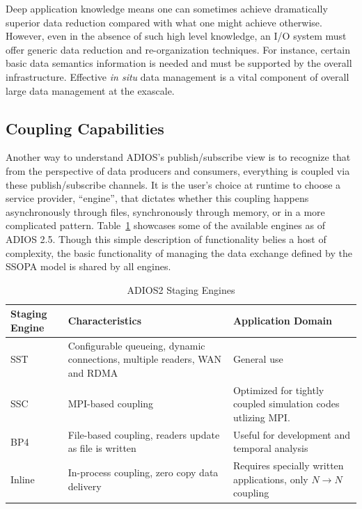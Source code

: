 Deep application knowledge means one can sometimes achieve dramatically superior data reduction compared with what one might achieve otherwise. However, even in the absence of such high level knowledge, an I/O system must offer generic data reduction and re-organization techniques. For instance, certain basic data semantics information is needed and must be supported by the overall infrastructure. Effective \textit{in situ} data management is a vital component of overall large data management at the exascale.


\subsection{Coupling Capabilities %
}
\label{sec:coupling}

Another way to understand ADIOS's publish/subscribe view\cite{Flexpath,choi2018} is to recognize that from the perspective of data producers and consumers, everything is coupled via these publish/subscribe channels. It is the user's choice at runtime to choose a service provider, ``engine'', that dictates whether this coupling happens asynchronously through files, synchronously through memory, or in a more complicated pattern. Table~\ref{tab:engines} showcases some of the available engines as of ADIOS 2.5.
Though this simple description of functionality belies a host of complexity,
the basic functionality of managing the data exchange defined by the SSOPA model is shared by all engines.


\begin{table}
\begin{center}
\footnotesize 
{}
\begin{tabular}{ | m{7em} || m{15em}| m{15em} | } 
\hline
\rowcolor{gray!55}
Staging Engine & Characteristics & Application Domain \\ 
\hline \hline
SST & Configurable queueing, dynamic connections, multiple readers, WAN and RDMA &  General use\\ 
\hline
SSC & MPI-based coupling & Optimized for tightly coupled simulation codes utlizing MPI. \\ 
\hline
BP4 & File-based coupling, readers update as file is written  & Useful for development and temporal analysis\\ 
\hline
Inline & In-process coupling, zero copy data delivery & Requires specially written applications, only $N\rightarrow N$ coupling\\
\hline
\end{tabular}
\caption{ADIOS2 Staging Engines} \label{tab:engines}
\vspace{-25pt}
\end{center}
\end{table}



